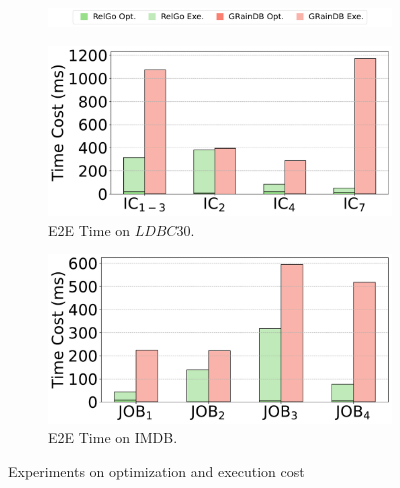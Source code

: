 \begin{figure}[t]
    \vspace{-0.5em}
    \centering
    \begin{subfigure}[b]{\linewidth}
        \centering
        \includegraphics[width=\linewidth]{./figures/exp/opt_exe_legends.pdf}
        \label{fig:exp-opt-legends}
        \vspace*{-3.5ex}
    \end{subfigure}
    \begin{subfigure}[b]{0.48\linewidth}
        \centering
        \includegraphics[width=\linewidth]{./figures/exp/opt_exe_ldbc.pdf}
        \vspace{-1.5em}
        \caption{E2E Time on $LDBC30$.}
        \label{fig:exp-opt-ldbc}
    \end{subfigure}
    \begin{subfigure}[b]{0.48\linewidth}
        \centering
        \includegraphics[width=\linewidth]{./figures/exp/opt_exe_job.pdf}
        \vspace{-1.5em}
        \caption{E2E Time on IMDB.}
        \label{fig:exp-opt-job}
    \end{subfigure}
    \caption{Experiments on optimization and execution cost}
    \vspace{-0.5em}
    \label{fig:exp-optimization}
\end{figure}

